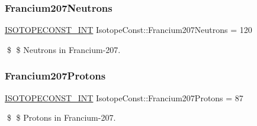 \subsubsection{\texorpdfstring{Francium207\+Neutrons}{Francium207Neutrons}}
{\footnotesize\ttfamily \mbox{\hyperlink{group___isotope_const-_macros_ga5f18360b3e99483a35c32d789e62621c}{I\+S\+O\+T\+O\+P\+E\+C\+O\+N\+S\+T\+\_\+\+I\+NT}} Isotope\+Const\+::\+Francium207\+Neutrons = 120}

\$ \$ Neutrons in Francium-\/207. \mbox{\label{group___isotope_const-_francium-_fr207_ga5584e4cce312ff8aa443e86b6ca2eb91}} 
\subsubsection{\texorpdfstring{Francium207\+Protons}{Francium207Protons}}
{\footnotesize\ttfamily \mbox{\hyperlink{group___isotope_const-_macros_ga5f18360b3e99483a35c32d789e62621c}{I\+S\+O\+T\+O\+P\+E\+C\+O\+N\+S\+T\+\_\+\+I\+NT}} Isotope\+Const\+::\+Francium207\+Protons = 87}

\$ \$ Protons in Francium-\/207. 